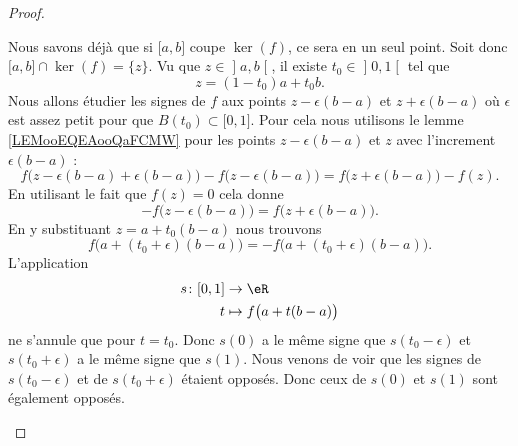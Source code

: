 \begin{proof}
\begin{subproof}
    Nous savons déjà que si \( \mathopen[ a , b \mathclose]\) coupe $\ker(f)$, ce sera en un seul point. Soit donc \( \mathopen[ a , b \mathclose]\cap\ker(f)=\{ z \}\). Vu que \( z\in \mathopen] a , b \mathclose[\), il existe \( t_0\in \mathopen] 0 , 1 \mathclose[\) tel que
    \begin{equation}
        z=(1-t_0)a+t_0b.
    \end{equation}
    Nous allons étudier les signes de \( f\) aux points \( z-\epsilon(b-a)\) et \( z+\epsilon(b-a)\) où \( \epsilon\) est assez petit pour que \( B(t_0)\subset \mathopen[ 0 , 1 \mathclose]\). Pour cela nous utilisons le lemme \ref{LEMooEQEAooQaFCMW} pour les points \( z-\epsilon(b-a)\) et \( z\) avec l'increment \( \epsilon(b-a)\) :
    \begin{equation}
        f\big( z-\epsilon(b-a)+\epsilon(b-a) \big)-f\big( z-\epsilon(b-a) \big)=f\big( z+\epsilon(b-a) \big)-f(z).
    \end{equation}
    En utilisant le fait que \( f(z)=0\) cela donne
    \begin{equation}
        -f\big( z-\epsilon(b-a) \big)=f\big( z+\epsilon(b-a) \big).
    \end{equation}
    En y substituant \( z=a+t_0(b-a)\) nous trouvons
    \begin{equation}
        f\big( a+(t_0+\epsilon)(b-a) \big)=-f\big( a+(t_0+\epsilon)(b-a) \big).
    \end{equation}
    L'application
    \begin{equation}
        \begin{aligned}
            s\colon \mathopen[ 0 , 1 \mathclose]&\to \eR \\
            t&\mapsto f\big( a+t(b-a) \big) 
        \end{aligned}
    \end{equation}
    ne s'annule que pour \( t=t_0\). Donc \( s(0)\) a le même signe que \( s(t_0-\epsilon)\) et \( s(t_0+\epsilon)\) a le même signe que \( s(1)\). Nous venons de voir que les signes de \( s(t_0-\epsilon)\) et de \( s(t_0+\epsilon)\) étaient opposés. Donc ceux de \( s(0)\) et \( s(1)\) sont également opposés.
    \end{subproof}
\end{proof}


